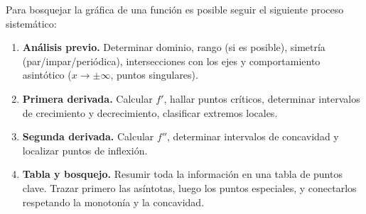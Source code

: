 \begin{pasos}
Para bosquejar la gráfica de una función es posible seguir el siguiente
proceso sistemático:
\begin{enumerate}
    \item \textbf{Análisis previo.} Determinar dominio, rango (si es
    posible), simetría (par/impar/periódica), intersecciones con los
    ejes y comportamiento asintótico ($x\to\pm\infty$, puntos
    singulares).
    \item \textbf{Primera derivada.} Calcular $f'$, hallar puntos
    críticos, determinar intervalos de crecimiento y decrecimiento,
    clasificar extremos locales.
    \item \textbf{Segunda derivada.} Calcular $f''$, determinar
    intervalos de concavidad y localizar puntos de inflexión.
    \item \textbf{Tabla y bosquejo.} Resumir toda la información en
    una tabla de puntos clave. Trazar primero las asíntotas, luego
    los puntos especiales, y conectarlos respetando la monotonía y la
    concavidad.
\end{enumerate}
\end{pasos}

